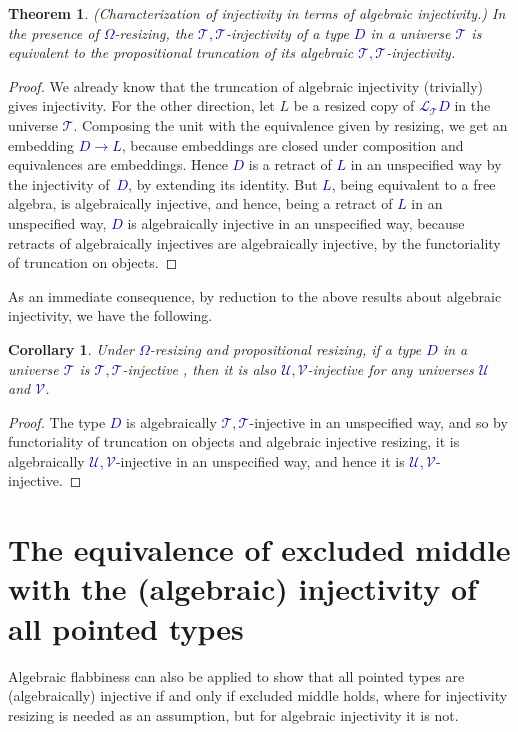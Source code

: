 \documentclass[10pt]{article}
\newcommand{\db}{\textcolor{darkblue}}
\newcommand{\m}[1]{\db{$#1$}}
\newcommand{\U}{\mathcal{U}}
\newcommand{\V}{\mathcal{V}}
\newcommand{\T}{\mathcal{T}}
\newcommand{\Lift}{\mathcal{L}}
\newtheorem{theorem}[numbered]{Theorem}
\newtheorem{corollary}[numbered]{Corollary}
\theoremstyle{definition}
\begin{document}
\begin{theorem} \label{better}
  (Characterization of injectivity in terms of algebraic injectivity.)
  In the presence of \m{\Omega}-resizing, the
  \m{\T,\T}-injectivity of a type \m{D} in a universe \m{\T} is
  equivalent to the propositional truncation of
  its algebraic \m{\T,\T}-injectivity.
\end{theorem}
\begin{proof}
  We already know that the truncation of algebraic injectivity
  (trivially) gives injectivity.  For the other direction, let $L$ be
  a resized copy of \m{\Lift_\T D} in the universe \m{\T}.  Composing
  the unit with the equivalence given by resizing, we get an embedding
  \m{D \to L}, because embeddings are closed under composition and
  equivalences are embeddings.  Hence \m{D} is a retract of \m{L} in
  an unspecified way by the injectivity of~\m{D}, by extending its
  identity.  But \m{L}, being equivalent to a free algebra, is
  algebraically injective, and hence, being a retract of \m{L} in an
  unspecified way, \m{D} is algebraically injective in an unspecified
  way, because retracts of algebraically injectives are algebraically
  injective, by the functoriality of truncation on objects.
\end{proof}

As an immediate consequence, by reduction to the above results about algebraic
injectivity, we have the following.
\begin{corollary}
  Under \m{\Omega}-resizing and propositional resizing, if a type
  \m{D} in a universe \m{\T} is \m{\T,\T}-injective , then it is also
  \m{\U,\V}-injective for any universes \m{\U} and \m{\V}.
\end{corollary}
\begin{proof}
  The type \m{D} is algebraically \m{\T,\T}-injective in an
  unspecified way, and so by functoriality of truncation on objects
  and algebraic injective resizing, it is algebraically
  \m{\U,\V}-injective in an unspecified way, and hence it is
  \m{\U,\V}-injective.
\end{proof}

\section{The equivalence of  excluded middle with the (algebraic) injectivity of all pointed types}

Algebraic flabbiness can also be applied to show that all pointed
types are (algebraically) injective if and only if excluded middle
holds, where for injectivity resizing is needed as an assumption, but
for algebraic injectivity it is not.
\end{document}
